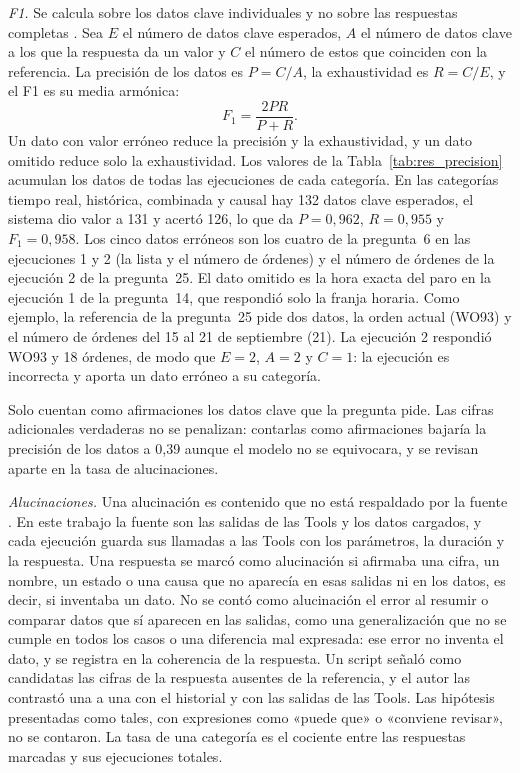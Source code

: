 \textit{F1.} Se calcula sobre los datos clave individuales y no sobre las respuestas completas \cite{Powers2011Evaluation,Sokolova2009Measures}. Sea $E$ el número de datos clave esperados, $A$ el número de datos clave a los que la respuesta da un valor y $C$ el número de estos que coinciden con la referencia. La precisión de los datos es $P = C/A$, la exhaustividad es $R = C/E$, y el F1 es su media armónica:
\begin{equation}
F_1 = \frac{2PR}{P+R}.
\end{equation}
Un dato con valor erróneo reduce la precisión y la exhaustividad, y un dato omitido reduce solo la exhaustividad. Los valores de la Tabla~\ref{tab:res_precision} acumulan los datos de todas las ejecuciones de cada categoría. En las categorías tiempo real, histórica, combinada y causal hay 132 datos clave esperados, el sistema dio valor a 131 y acertó 126, lo que da $P = 0{,}962$, $R = 0{,}955$ y $F_1 = 0{,}958$. Los cinco datos erróneos son los cuatro de la pregunta~6 en las ejecuciones 1 y 2 (la lista y el número de órdenes) y el número de órdenes de la ejecución 2 de la pregunta~25. El dato omitido es la hora exacta del paro en la ejecución 1 de la pregunta~14, que respondió solo la franja horaria. Como ejemplo, la referencia de la pregunta~25 pide dos datos, la orden actual (WO93) y el número de órdenes del 15 al 21 de septiembre (21). La ejecución 2 respondió WO93 y 18 órdenes, de modo que $E = 2$, $A = 2$ y $C = 1$: la ejecución es incorrecta y aporta un dato erróneo a su categoría.

Solo cuentan como afirmaciones los datos clave que la pregunta pide. Las cifras adicionales verdaderas no se penalizan: contarlas como afirmaciones bajaría la precisión de los datos a 0,39 aunque el modelo no se equivocara, y se revisan aparte en la tasa de alucinaciones.

\textit{Alucinaciones.} Una alucinación es contenido que no está respaldado por la fuente \cite{Ji2023Hallucination}. En este trabajo la fuente son las salidas de las Tools y los datos cargados, y cada ejecución guarda sus llamadas a las Tools con los parámetros, la duración y la respuesta. Una respuesta se marcó como alucinación si afirmaba una cifra, un nombre, un estado o una causa que no aparecía en esas salidas ni en los datos, es decir, si inventaba un dato. No se contó como alucinación el error al resumir o comparar datos que sí aparecen en las salidas, como una generalización que no se cumple en todos los casos o una diferencia mal expresada: ese error no inventa el dato, y se registra en la coherencia de la respuesta. Un script señaló como candidatas las cifras de la respuesta ausentes de la referencia, y el autor las contrastó una a una con el historial y con las salidas de las Tools. Las hipótesis presentadas como tales, con expresiones como «puede que» o «conviene revisar», no se contaron. La tasa de una categoría es el cociente entre las respuestas marcadas y sus ejecuciones totales.

